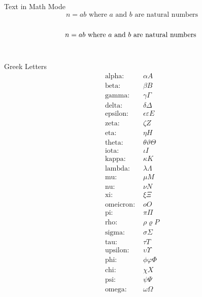 \documentclass[10pt]{article}
\begin{document}
    \begin{center}
        {\LARGE Text in Math Mode}\\
        \[ n = ab \text{ where } a \text{ and } b \text{ are natural numbers} \]\\
        \[ n = ab \text{ where \( a \) and \( b \) are natural numbers } \]\\
    \end{center}

    \begin{center}
        {\LARGE Greek Letters}
        \begin{align*}
            \text{alpha: }& \alpha  A\\
            \text{beta: }& \beta  B\\
            \text{gamma: }& \gamma  \Gamma\\
            \text{delta: }& \delta  \Delta\\
            \text{epsilon: }& \epsilon  \varepsilon  E\\
            \text{zeta: }& \zeta  Z\\
            \text{eta: }& \eta  H\\
            \text{theta: }& \theta  \vartheta  \Theta\\
            \text{iota: }& \iota  I\\
            \text{kappa: }& \kappa  K\\
            \text{lambda: }& \lambda  \Lambda\\
            \text{mu: }& \mu  M\\
            \text{nu: }& \nu  N\\
            \text{xi: }& \xi  \Xi\\
            \text{omeicron: }& o  O\\
            \text{pi: }& \pi  \Pi\\
            \text{rho: }& \rho \varrho P\\
            \text{sigma: }& \sigma \Sigma\\
            \text{tau: }& \tau T\\
            \text{upsilon: }& \upsilon \Upsilon\\
            \text{phi: }& \phi \varphi \Phi\\
            \text{chi: }& \chi X\\
            \text{psi: }& \psi \Psi\\
            \text{omega: }& \omega \Omega\\
        \end{align*}
    \end{center}
\end{document}
